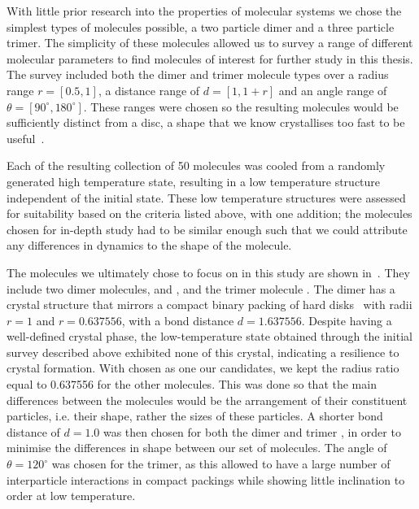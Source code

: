 With little prior research into the properties of molecular systems we chose the simplest types of molecules possible, a two particle dimer and a three particle trimer. The simplicity of these molecules allowed us to survey a range of different molecular parameters to find molecules of interest for further study in this thesis. The survey included both the dimer and trimer molecule types over a radius range $r = [0.5,1]$, a distance range of $d = [1,1+r]$ and an angle range of $\theta = [90^\circ,180^\circ]$. These ranges were chosen so the resulting molecules would be sufficiently distinct from a disc, a shape that we know crystallises too fast to be useful~\cite{verlet:67}.

Each of the resulting collection of 50 molecules was cooled from a randomly generated high temperature state, resulting in a low temperature structure independent of the initial state. These low temperature structures were assessed for suitability based on the criteria listed above, with one addition; the molecules chosen for in-depth study had to be similar enough such that we could attribute any differences in dynamics to the shape of the molecule.

The molecules we ultimately chose to focus on in this study are shown in~. They include two dimer molecules, \done and \dcon, and the trimer molecule \tri. The dimer \dcon has a crystal structure that mirrors a compact binary packing of hard disks~ with radii $r = 1$ and $r = 0.637556$, with a bond distance $d = 1.637556$. Despite \dcon having a well-defined crystal phase, the low-temperature state obtained through the initial survey described above exhibited none of this crystal, indicating a resilience to crystal formation. With \dcon chosen as one our candidates, we kept the radius ratio equal to 0.637556 for the other molecules. This was done so that the main differences between the molecules would be the arrangement of their constituent particles, i.e. their shape, rather the sizes of these particles. A shorter bond distance of $d = 1.0$ was then chosen for both the dimer \done and trimer \tri, in order to minimise the differences in shape between our set of molecules. The angle of $\theta = 120^\circ$ was chosen for the trimer, as this allowed \tri to have a large number of interparticle interactions in compact packings while showing little inclination to order at low temperature.

